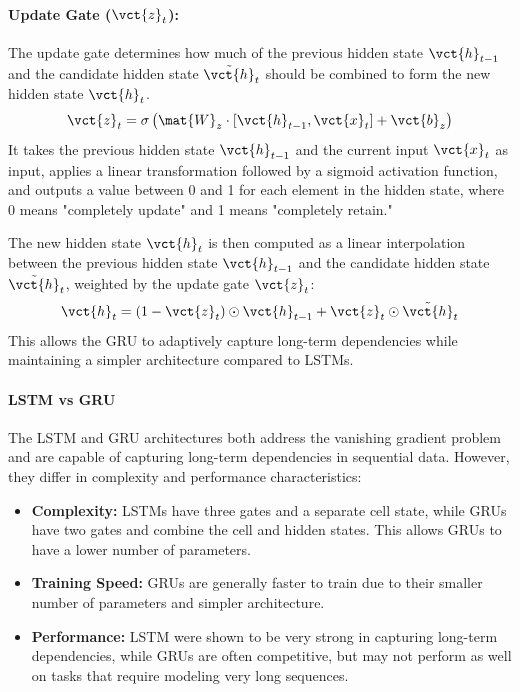 \paragraph{Update Gate ($\vct{z}_t$):}
The update gate determines how much of the previous hidden state $\vct{h}_{t-1}$ and the candidate hidden state $\tilde{\vct{h}}_t$ should be
combined to form the new hidden state $\vct{h}_t$.
\begin{equation}
    \vct{z}_t = \sigma\left(\mat{W}_z \cdot [\vct{h}_{t-1}, \vct{x}_t] + \vct{b}_z\right)
\end{equation}
It takes the previous hidden state $\vct{h}_{t-1}$ and the current input $\vct{x}_t$ as input, applies a linear transformation followed by a sigmoid activation function,
and outputs a value between 0 and 1 for each element in the hidden state, where 0 means "completely update" and 1 means "completely retain."

The new hidden state $\vct{h}_t$ is then computed as a linear interpolation between the previous hidden state $\vct{h}_{t-1}$ and the candidate hidden state $\tilde{\vct{h}}_t$,
weighted by the update gate $\vct{z}_t$:
\begin{equation}
    \vct{h}_t = (1 - \vct{z}_t) \odot \vct{h}_{t-1} + \vct{z}_t \odot \tilde{\vct{h}}_t
\end{equation}
This allows the GRU to adaptively capture long-term dependencies while maintaining a simpler architecture compared to LSTMs.

\paragraph{LSTM vs GRU}
The LSTM and GRU architectures both address the vanishing gradient problem and are capable of capturing long-term dependencies in sequential data.
However, they differ in complexity and performance characteristics:
\begin{itemize}
    \item \textbf{Complexity:} LSTMs have three gates and a separate cell state, while GRUs have two gates and combine the cell and hidden states.
    This allows GRUs to have a lower number of parameters.
    \item \textbf{Training Speed:} GRUs are generally faster to train due to their smaller number of parameters and simpler architecture.
    \item \textbf{Performance:} LSTM were shown to be very strong in capturing long-term dependencies, while GRUs are often competitive,
    but may not perform as well on tasks that require modeling very long sequences.
\end{itemize}

